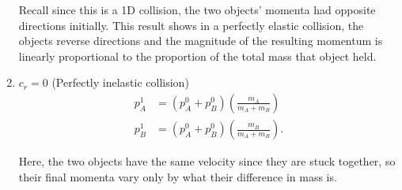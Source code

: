 \documentclass[a4paper,11pt, oneside]{article}
\newcommand{\mtot}{m_A + m_B}
\begin{document}
\begin{enumerate}
Recall since this is a 1D collision, the two objects' momenta had opposite directions initially.  This result shows in a perfectly elastic collision, the objects reverse directions and the magnitude of the resulting momentum is linearly proportional to the proportion of the total mass that object held.

\item $c_r = 0$ (Perfectly inelastic collision)
\begin{align*}
    p_A^1 &= (p_A^0 + p_B^0)\left(\frac{m_A}{\mtot}\right)\\
    p_B^1 &= (p_A^0 + p_B^0)\left(\frac{m_B}{\mtot}\right).
\end{align*}

Here, the two objects have the same velocity since they are stuck together, so their final momenta vary only by what their difference in mass is.



\end{enumerate}
\end{document}
